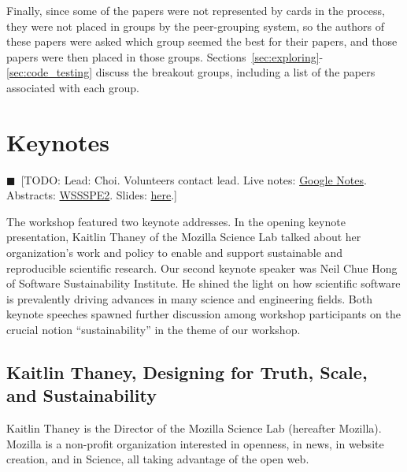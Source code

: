 \documentclass[11pt, oneside]{amsart}
\newcommand{\todo}[1]{{\color{blue}$\blacksquare$~\textsf{[TODO: #1]}}}
\begin{document}
Finally, since some of the papers were not represented by cards in the process,
they were not placed in groups by the peer-grouping system, so the authors of
these papers were asked which group seemed the best for their papers, and those
papers were then placed in those groups. Sections~\ref{sec:exploring}-\ref{sec:code_testing}
discuss the breakout groups, including a list of the papers associated with each
group.


\section{Keynotes} \label{sec:keynotes}
\todo{\footnotesize{Lead: Choi. Volunteers contact lead. Live notes: \href{http://tinyurl.com/q6ew45v}{Google Notes}}.
Abstracts: \href{http://tinyurl.com/mnenzms}{WSSSPE2}. Slides: \href{http://tinyurl.com/las8tsq}{here}.}

The workshop featured two keynote addresses. In the opening keynote
presentation, Kaitlin Thaney of the Mozilla Science Lab talked about her
organization's work and policy to enable and support sustainable and
reproducible scientific research. Our second keynote speaker was Neil Chue Hong
of Software Sustainability Institute. He shined the light on how scientific
software is prevalently driving advances in many science and engineering fields.
Both keynote speeches spawned further discussion among workshop participants on
the crucial notion ``sustainability'' in the theme of our workshop.

\subsection{Kaitlin Thaney, Designing for Truth, Scale, and Sustainability}
\label{keynote1}


Kaitlin Thaney is the Director of the Mozilla Science Lab (hereafter Mozilla).
Mozilla is a non-profit organization interested in openness, in news, in website
creation, and in Science, all taking advantage of the open web. 
\end{document}
